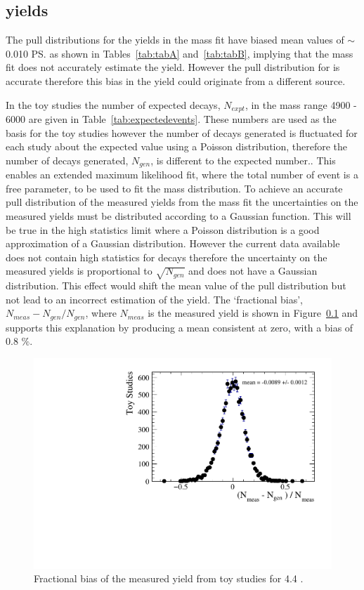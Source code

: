\subsection{\bsmumu yields}
The pull distributions for the \bsmumu yields in the mass fit have biased mean values of $\sim$ 0.010 \ps as shown in Tables~\ref{tab:tabA} and~\ref{tab:tabB}, implying that the mass fit does not accurately estimate the \bsmumu yield. However the pull distribution for \Gmumu is accurate therefore this bias in the \bsmumu yield could originate from a different source.

In the toy studies the number of expected decays, $N_{expt}$, in the mass range 4900 - 6000 \mevcc are given in Table~\ref{tab:expectedevents}. These numbers are used as the basis for the toy studies however the number of decays generated is fluctuated for each study about the expected value using a Poisson distribution, therefore the number of decays generated, $N_{gen}$, is different to the expected number.. This enables an extended maximum likelihood fit, where the total number of event is a free parameter, to be used to fit the mass distribution. To achieve an accurate pull distribution of the measured \bsmumu yields from the mass fit the uncertainties on the measured yields must be distributed according to a Gaussian function. This will be true in the high statistics limit where a Poisson distribution is a good approximation of a Gaussian distribution. However the current data available does not contain high statistics for \bsmumu decays therefore the uncertainty on the measured yields is proportional to $\sqrt{N_{gen}}$ and does not have a Gaussian distribution. This effect would shift the mean value of the pull distribution but not lead to an incorrect estimation of the \bsmumu yield. The `fractional bias', $N_{meas} - N_{gen}/N_{gen}$, where $N_{meas}$ is the measured \bsmumu yield is shown in Figure~\ref{} and supports this explanation by producing a mean consistent at zero, with a bias of 0.8 $\%$. 

\begin{figure}[htbp]
    \centering
        \includegraphics[width=0.6 \textwidth]{./Figs/LifetimeSystematics/Bs2MuMu_yield_fraction_bias_CKM16.pdf}
    \caption{Fractional bias of the measured \bsmumu yield from toy studies for 4.4 \fb.}
    \label{fig:FracBias}
\end{figure}



